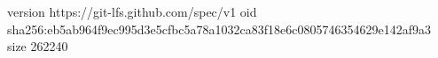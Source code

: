 version https://git-lfs.github.com/spec/v1
oid sha256:eb5ab964f9ec995d3e5cfbc5a78a1032ca83f18e6c0805746354629e142af9a3
size 262240
